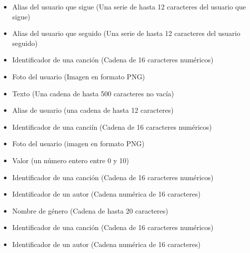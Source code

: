 \begin{itemize}
\item Alias del usuario que sigue (Una serie de hasta 12 caracteres del usuario que sigue)
\item Alias del usuario que seguido (Una serie de hasta 12 caracteres del usuario seguido)
\end{itemize}

\begin{itemize}
\item Identificador de una canción (Cadena de 16 caracteres numéricos)
\item Foto del usuario (Imagen en formato PNG)
\item Texto (Una cadena de hasta 500 caracteres no vacía)
\end{itemize}

\begin{itemize}
\item Alias de usuario (una cadena de hasta 12 caracteres)
\item Identificador de una canciín (Cadena de 16 caracteres numéricos) 
\item Foto del usuario (imagen en formato PNG)
\item Valor (un número entero entre 0 y 10)
\end{itemize}



\begin{itemize}
  \item Identificador de una canción (Cadena de 16 caracteres numéricos)
  \item Identificador de un autor (Cadena numérica de 16 caracteres)
  \item Nombre de género (Cadena de hasta 20 caracteres)
\end{itemize}

\begin{itemize}
  \item Identificador de una canción (Cadena de 16 caracteres numéricos)
\end{itemize}

\begin{itemize}
  \item Identificador de un autor (Cadena numérica de 16 caracteres)
\end{itemize}

